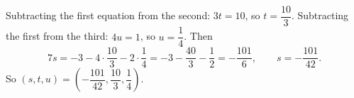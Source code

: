 Subtracting the first equation from the second: $3t=10$, so $t=\dfrac{10}3$. Subtracting the first from the third: $4u=1$, so $u=\dfrac14$. Then
\[7s=-3-4\cdot\dfrac{10}{3}-2\cdot\dfrac14=-3-\dfrac{40}3-\dfrac12=-\dfrac{101}{6},\qquad s=-\dfrac{101}{42}.\]
So $\boxed{(s,t,u)=\left(-\dfrac{101}{42},\dfrac{10}{3},\dfrac14\right)}$.
